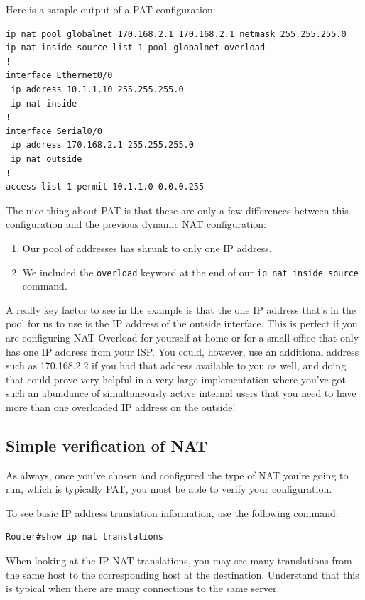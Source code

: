 \documentclass[b5paper,11pt]{memoir}
\begin{document}
Here is a sample output of a PAT configuration:

\begin{verbatim}
ip nat pool globalnet 170.168.2.1 170.168.2.1 netmask 255.255.255.0
ip nat inside source list 1 pool globalnet overload
!
interface Ethernet0/0
 ip address 10.1.1.10 255.255.255.0
 ip nat inside
!
interface Serial0/0
 ip address 170.168.2.1 255.255.255.0
 ip nat outside
!
access-list 1 permit 10.1.1.0 0.0.0.255
\end{verbatim}

The nice thing about
PAT is that these are only a few differences between this configuration
and the previous dynamic NAT configuration:

\begin{enumerate}
\tightlist
\item
  Our pool of addresses has shrunk to only one IP address.
\item
  We included the \texttt{overload} keyword at the end of our
  \texttt{ip\ nat\ inside\ source} command.
\end{enumerate}

A really key factor to see in the example is that the one IP address
that's in the pool for us to use is the IP address of the outside
interface. This is perfect if you are configuring NAT Overload for
yourself at home or for a small office that only has one IP address from
your ISP. You could, however, use an additional address such as
170.168.2.2 if you had that address available to you as well, and doing
that could prove very helpful in a very large implementation where
you've got such an abundance of simultaneously active internal users
that you need to have more than one overloaded IP address on the
outside!




\subsection{Simple verification of NAT}

As always, once you've chosen and configured the type of NAT you're
going to run, which is typically PAT, you must be able to verify your
configuration.

To see basic IP address translation information, use the following
command:

\begin{verbatim}
Router#show ip nat translations
\end{verbatim}

When looking at the IP NAT translations, you may see many translations
from the same host to the corresponding host at the destination.
Understand that this is typical when there are many connections to the
same server.
\end{document}
